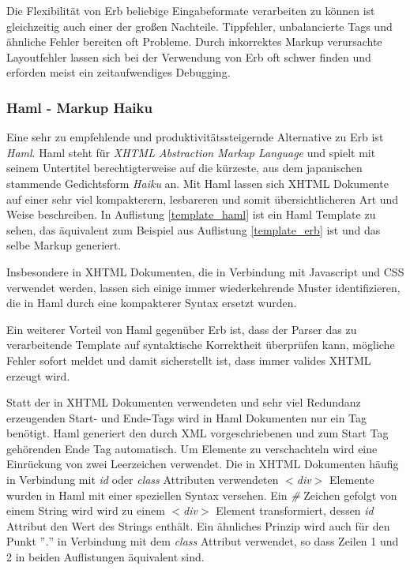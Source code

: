 

Die Flexibilität von Erb beliebige Eingabeformate verarbeiten zu
können ist gleichzeitig auch einer der großen Nachteile. Tippfehler,
unbalancierte Tags und ähnliche Fehler bereiten oft Probleme. Durch
inkorrektes Markup verursachte Layoutfehler lassen sich bei der
Verwendung von Erb oft schwer finden und erforden meist ein
zeitaufwendiges Debugging.

\subsubsection{Haml - Markup Haiku}

Eine sehr zu empfehlende und produktivitätssteigernde Alternative zu
Erb ist \textit{Haml}. Haml steht für \textit{XHTML Abstraction Markup
  Language} und spielt mit seinem Untertitel berechtigterweise auf die
kürzeste, aus dem japanischen stammende Gedichtsform \textit{Haiku}
an. Mit Haml lassen sich XHTML Dokumente auf einer sehr viel
kompakterern, lesbareren und somit übersichtlicheren Art und Weise
beschreiben. In Auflistung \ref{template_haml} ist ein Haml Template
zu sehen, das äquivalent zum Beispiel aus Auflistung
\ref{template_erb} ist und das selbe Markup generiert.



Insbesondere in XHTML Dokumenten, die in Verbindung mit Javascript und
CSS verwendet werden, lassen sich einige immer wiederkehrende Muster
identifizieren, die in Haml durch eine kompakterer Syntax ersetzt
wurden.

Ein weiterer Vorteil von Haml gegenüber Erb ist, dass der Parser das
zu verarbeitende Template auf syntaktische Korrektheit überprüfen
kann, mögliche Fehler sofort meldet und damit sicherstellt ist, dass
immer valides XHTML erzeugt wird.

Statt der in XHTML Dokumenten verwendeten und sehr viel Redundanz
erzeugenden Start- und Ende-Tags wird in Haml Dokumenten nur ein Tag
benötigt. Haml generiert den durch XML vorgeschriebenen und zum Start
Tag gehörenden Ende Tag automatisch. Um Elemente zu verschachteln wird
eine Einrückung von zwei Leerzeichen verwendet. Die in XHTML
Dokumenten häufig in Verbindung mit \textit{id} oder \textit{class}
Attributen verwendeten \textit{$<$div$>$} Elemente wurden in Haml mit
einer speziellen Syntax versehen. Ein \textit{\#} Zeichen gefolgt von
einem String wird wird zu einem \textit{$<$div$>$} Element
transformiert, dessen \textit{id} Attribut den Wert des Strings
enthält. Ein ähnliches Prinzip wird auch für den Punkt ''\textit{.}''
in Verbindung mit dem \textit{class} Attribut verwendet, so dass
Zeilen 1 und 2 in beiden Auflistungen äquivalent sind.

